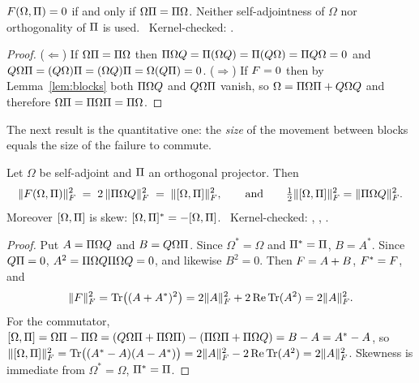 \begin{theorem}[Compatibility]\label{thm:compat}
$F(\Omega,\Pi)=0$ if and only if $\Omega\Pi=\Pi\Omega$. Neither self-adjointness of $\Omega$
nor orthogonality of $\Pi$ is used.
\T\ Kernel-checked: .
\end{theorem}

\begin{proof}
($\Leftarrow$) If $\Omega\Pi=\Pi\Omega$ then $\Pi\Omega Q=\Pi(\Omega Q)=\Pi(Q\Omega)=\Pi Q\Omega=0$
and $Q\Omega\Pi=(Q\Omega)\Pi=(\Omega Q)\Pi=\Omega(Q\Pi)=0$.
($\Rightarrow$) If $F=0$ then by Lemma~\ref{lem:blocks} both $\Pi\Omega Q$ and $Q\Omega\Pi$
vanish, so $\Omega=\Pi\Omega\Pi+Q\Omega Q$ and therefore
$\Omega\Pi=\Pi\Omega\Pi=\Pi\Omega$.
\end{proof}

The next result is the quantitative one: the \emph{size} of the movement between blocks equals
the size of the failure to commute.

\begin{theorem}\label{thm:norm}
Let $\Omega$ be self-adjoint and $\Pi$ an orthogonal projector. Then
\begin{equation}\label{eq:norm}
   \lVert F(\Omega,\Pi)\rVert_F^2 \;=\; 2\,\lVert\Pi\Omega Q\rVert_F^2 \;=\; \lVert[\Omega,\Pi]\rVert_F^2 ,
   \qquad\text{and}\qquad \tfrac12\lVert[\Omega,\Pi]\rVert_F^2=\lVert\Pi\Omega Q\rVert_F^2 .
\end{equation}
Moreover $[\Omega,\Pi]$ is skew: $[\Omega,\Pi]^*=-[\Omega,\Pi]$.
\T\ Kernel-checked: , ,
.
\end{theorem}

\begin{proof}
Put $A=\Pi\Omega Q$ and $B=Q\Omega\Pi$. Since $\Omega^*=\Omega$ and $\Pi^*=\Pi$,
$B=A^*$. Since $Q\Pi=0$, $A^2=\Pi\Omega Q\Pi\Omega Q=0$, and likewise $B^2=0$.
Then $F=A+B$, $F^*=F$, and
\[
   \lVert F\rVert_F^2=\operatorname{Tr}\bigl((A+A^*)^2\bigr)=2\lVert A\rVert_F^2+2\operatorname{Re}\operatorname{Tr}(A^2)=2\lVert A\rVert_F^2 .
\]
For the commutator, $[\Omega,\Pi]=\Omega\Pi-\Pi\Omega=(Q\Omega\Pi+\Pi\Omega\Pi)-(\Pi\Omega\Pi+\Pi\Omega Q)=B-A=A^*-A$,
so $\lVert[\Omega,\Pi]\rVert_F^2=\operatorname{Tr}\bigl((A^*-A)(A-A^*)\bigr)=2\lVert A\rVert_F^2-2\operatorname{Re}\operatorname{Tr}(A^2)=2\lVert A\rVert_F^2$.
Skewness is immediate from $\Omega^*=\Omega$, $\Pi^*=\Pi$.
\end{proof}

